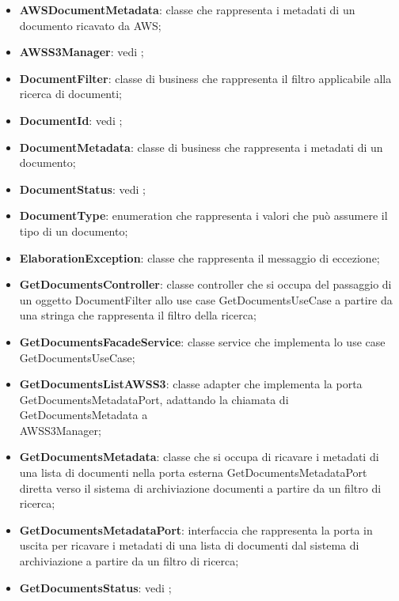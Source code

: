 \documentclass[10pt, a4paper]{article}
\begin{document}
\begin{itemize}
    \item \label{AWSDocumentMetadata}\textbf{AWSDocumentMetadata}: classe che rappresenta i metadati di un documento ricavato da AWS;
    \item \textbf{AWSS3Manager}: vedi ;
    \item \label{DocumentFilter}\textbf{DocumentFilter}: classe di business che rappresenta il filtro applicabile alla ricerca di documenti;
    \item \textbf{DocumentId}: vedi ;
    \item \label{DocumentMetadata}\textbf{DocumentMetadata}: classe di business che rappresenta i metadati di un documento;
    \item \textbf{DocumentStatus}: vedi ;
    \item \label{DocumentType}\textbf{DocumentType}: enumeration che rappresenta i valori che può assumere il tipo di un documento;
    \item \label{ElaborationException}\textbf{ElaborationException}: classe che rappresenta il messaggio di eccezione;
     \item \label{GetDocumentsController}\textbf{GetDocumentsController}: classe controller che si occupa del passaggio di un oggetto DocumentFilter allo use case GetDocumentsUseCase a partire da una stringa che rappresenta il filtro della ricerca;
     \item \label{GetDocumentsFacadeService}\textbf{GetDocumentsFacadeService}: classe service che implementa lo use case GetDocumentsUseCase;
     \item \label{GetDocumentsListAWSS3}\textbf{GetDocumentsListAWSS3}: classe adapter che implementa la porta GetDocumentsMetadataPort, adattando la chiamata di GetDocumentsMetadata a \\AWSS3Manager;
     \item \label{GetDocumentsMetadata}\textbf{GetDocumentsMetadata}: classe che si occupa di ricavare i metadati di una lista di documenti nella porta esterna GetDocumentsMetadataPort diretta verso il sistema di archiviazione documenti a partire da un filtro di ricerca;
     \item \label{GetDocumentsMetadataPort}\textbf{GetDocumentsMetadataPort}: interfaccia che rappresenta la porta in uscita per ricavare i metadati di una lista di documenti dal sistema di archiviazione a partire da un filtro di ricerca;
     \item \textbf{GetDocumentsStatus}: vedi ;

\end{itemize}
\end{document}
